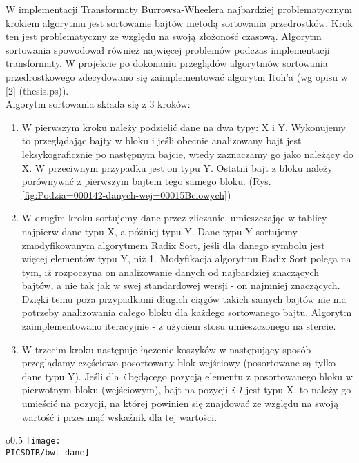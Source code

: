 W implementacji Transformaty Burrowsa-Wheelera najbardziej problematycznym
krokiem algorytmu jest sortowanie bajtów metodą sortowania przedrostków.
Krok ten jest problematyczny ze względu na swoją złożoność czasową.
Algorytm sortowania spowodował również najwięcej problemów podczas
implementacji transformaty. W projekcie po dokonaniu przeglądów algorytmów
sortowania przedrostkowego zdecydowano się zaimplementować algorytm
Itoh'a (wg opisu w {[}2{]} (thesis.ps)).\\
 Algorytm sortowania składa się z 3 kroków: 
\begin{enumerate}
\item W pierwszym kroku należy podzielić dane na dwa typy: X i Y. Wykonujemy
to przeglądając bajty w bloku i jeśli obecnie analizowany bajt jest
leksykograficznie po następnym bajcie, wtedy zaznaczamy go jako należący
do X. W przeciwnym przypadku jest on typu Y. Ostatni bajt z bloku
należy porównywać z pierwszym bajtem tego samego bloku. (Rys. \ref{fig:Podzia=000142-danych-wej=00015Bciowych})
\item W drugim kroku sortujemy dane przez zliczanie, umieszczając w tablicy
najpierw dane typu X, a później typu Y. Dane typu Y sortujemy zmodyfikowanym
algorytmem Radix Sort, jeśli dla danego symbolu jest więcej elementów
typu Y, niż 1. Modyfikacja algorytmu Radix Sort polega na tym, iż
rozpoczyna on analizowanie danych od najbardziej znaczących bajtów,
a nie tak jak w swej standardowej wersji - on najmniej znaczących.
Dzięki temu poza przypadkami długich ciągów takich samych bajtów nie
ma potrzeby analizowania całego bloku dla każdego sortowanego bajtu.
Algorytm zaimplementowano iteracyjnie - z użyciem stosu umieszczonego
na stercie. 
\item W trzecim kroku następuje łączenie koszyków w następujący sposób -
przeglądamy częściowo posortowany blok wejściowy (posortowane są tylko
dane typu Y). Jeśli dla \emph{i} będącego pozycją elementu z posortowanego
bloku w pierwotnym bloku (wejściowym), bajt na pozycji \emph{i-1}
jest typu X, to należy go umieścić na pozycji, na której powinien
się znajdować ze względu na swoją wartość i przesunąć wskaźnik dla
tej wartości. 
\end{enumerate}
\begin{wrapfigure}{o}{0.5\columnwidth}%
\centering
\texttt{[image: \\PICSDIR/bwt\_dane]}

\caption{\label{fig:Podzia=000142-danych-wej=00015Bciowych}Przykład - podział
danych wejściowych na typy}
\end{wrapfigure}%
%

